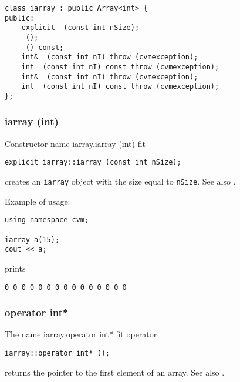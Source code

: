 \bigskip
\noindent
\verb"class iarray : public Array<int> {"\\
\verb"public:"\\
\verb"    explicit "\verb" (const int nSize);"\\
\verb"    "\verb" ();"\\
\verb"    "\verb" () const;"\\
\verb"    int& "\verb" (const int nI) throw (cvmexception);"\\
\verb"    int "\verb" (const int nI) const throw (cvmexception);"\\
\verb"    int& "\verb" (const int nI) throw (cvmexception);"\\
\verb"    int "\verb" (const int nI) const throw (cvmexception);"\\
\verb"};"
\newpage





\subsubsection{iarray (int)}
Constructor%
\pdfdest name {iarray.iarray (int)} fit
\begin{verbatim}
explicit iarray::iarray (const int nSize);
\end{verbatim}
creates an \verb"iarray" object with the size equal to \verb"nSize".
See also .

Example of usage:
\begin{verbatim}
using namespace cvm;

iarray a(15);
cout << a;
\end{verbatim}
prints
\begin{verbatim}
0 0 0 0 0 0 0 0 0 0 0 0 0 0 0
\end{verbatim}
\newpage


\subsubsection{operator int*}
The%
\pdfdest name {iarray.operator int*} fit
operator
\begin{verbatim}
iarray::operator int* ();
\end{verbatim}
returns the pointer to the first element of an array.
See also .

